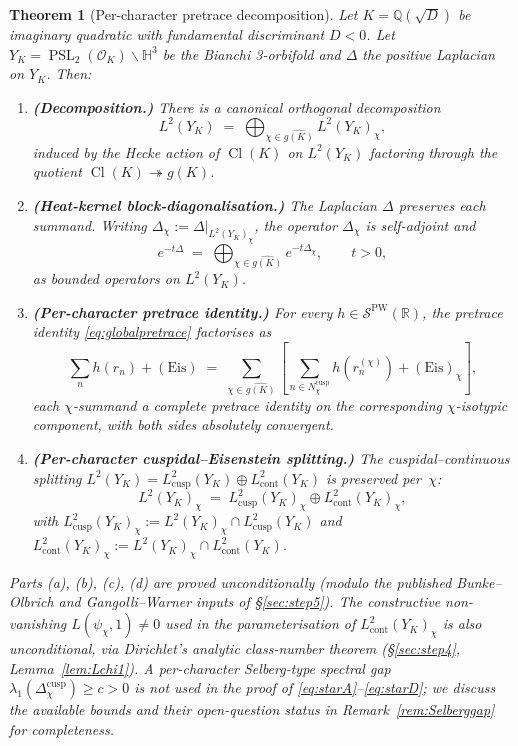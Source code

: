\documentclass[11pt,a4paper,reqno]{amsart}
\newtheorem{theorem}{Theorem}[section]
\theoremstyle{definition}
\DeclareMathOperator{\PSL}{PSL}
\DeclareMathOperator{\Cl}{Cl}
\newcommand{\OK}{\mathcal{O}_K}
\newcommand{\HH}{\mathbb{H}}
\newcommand{\RR}{\mathbb{R}}
\newcommand{\QQ}{\mathbb{Q}}
\newcommand{\YK}{Y_K}
\newcommand{\gK}{g(K)}
\newcommand{\dualgK}{\widehat{g(K)}}
\newcommand{\Lcusp}{L^2_{\mathrm{cusp}}}
\newcommand{\Lcont}{L^2_{\mathrm{cont}}}
\newcommand{\PW}{\mathcal{S}^{\mathrm{PW}}}
\begin{document}
\begin{theorem}[Per-character pretrace decomposition]\label{thm:main}
Let $K=\QQ(\sqrt{D})$ be imaginary quadratic with fundamental discriminant $D<0$. Let $\YK = \PSL_2(\OK)\backslash\HH^3$ be the Bianchi 3-orbifold and $\Delta$ the positive Laplacian on $\YK$. Then:
\begin{enumerate}[label=(\alph*),leftmargin=2em]
  \item \textbf{(Decomposition.)} There is a canonical orthogonal decomposition
        \begin{equation}\label{eq:starA}
          L^2(\YK) \;=\; \bigoplus_{\chi\in\dualgK} L^2(\YK)_\chi,
        \end{equation}
        induced by the Hecke action of $\Cl(K)$ on $L^2(\YK)$ factoring through the quotient $\Cl(K)\twoheadrightarrow\gK$.
  \item \textbf{(Heat-kernel block-diagonalisation.)} The Laplacian $\Delta$ preserves each summand. Writing $\Delta_\chi := \Delta\big|_{L^2(\YK)_\chi}$, the operator $\Delta_\chi$ is self-adjoint and
        \begin{equation}\label{eq:starB}
          e^{-t\Delta} \;=\; \bigoplus_{\chi\in\dualgK} e^{-t\Delta_\chi}, \qquad t>0,
        \end{equation}
        as bounded operators on $L^2(\YK)$.
  \item \textbf{(Per-character pretrace identity.)} For every $h\in\PW(\RR)$, the pretrace identity \eqref{eq:globalpretrace} factorises as
        \begin{equation}\label{eq:starC}
          \sum_n h(r_n) + (\mathrm{Eis})
          \;=\; \sum_{\chi\in\dualgK}\!\left[
            \sum_{n\in N_\chi^{\mathrm{cusp}}} h(r_n^{(\chi)})
            + (\mathrm{Eis})_\chi
          \right],
        \end{equation}
        each $\chi$-summand a complete pretrace identity on the corresponding $\chi$-isotypic component, with both sides absolutely convergent.
  \item \textbf{(Per-character cuspidal--Eisenstein splitting.)} The cuspidal--continuous splitting $L^2(\YK)=\Lcusp(\YK)\oplus\Lcont(\YK)$ is preserved per~$\chi$:
        \begin{equation}\label{eq:starD}
          L^2(\YK)_\chi \;=\; \Lcusp(\YK)_\chi \oplus \Lcont(\YK)_\chi,
        \end{equation}
        with $\Lcusp(\YK)_\chi := L^2(\YK)_\chi\cap\Lcusp(\YK)$ and $\Lcont(\YK)_\chi := L^2(\YK)_\chi\cap\Lcont(\YK)$.
\end{enumerate}
Parts (a), (b), (c), (d) are proved unconditionally (modulo the published Bunke--Olbrich and Gangolli--Warner inputs of \S\ref{sec:step5}). The constructive non-vanishing $L(\psi_\chi,1)\neq 0$ used in the parameterisation of $\Lcont(\YK)_\chi$ is also unconditional, via Dirichlet's analytic class-number theorem (\S\ref{sec:step4}, Lemma~\ref{lem:Lchi1}). A per-character Selberg-type spectral gap $\lambda_1(\Delta_\chi^{\mathrm{cusp}})\geq c>0$ is \emph{not used in the proof of \eqref{eq:starA}--\eqref{eq:starD}}; we discuss the available bounds and their open-question status in Remark~\ref{rem:Selberggap} for completeness.
\end{theorem}
\end{document}

